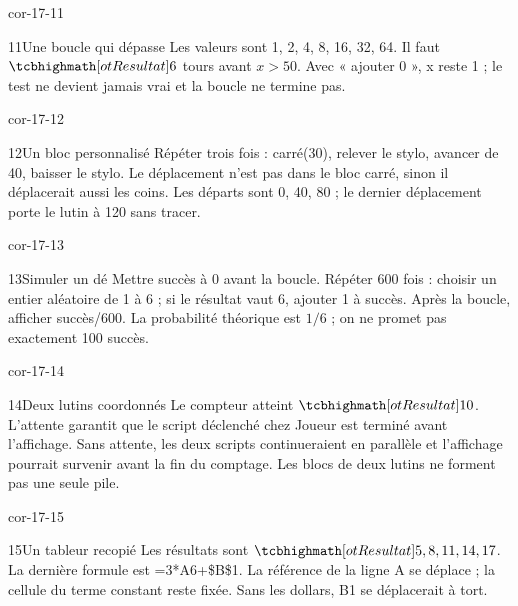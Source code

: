 \begin{blocLivre}{cor-17-11}\begin{corrige}{11}{Une boucle qui dépasse}
Les valeurs sont 1, 2, 4, 8, 16, 32, 64. Il faut $\res6$ tours avant $x>50$. Avec « ajouter 0 », x reste 1 ; le test ne devient jamais vrai et la boucle ne termine pas.
\label{fig-cor-17-11}
\end{corrige}\end{blocLivre}
\begin{blocLivre}{cor-17-12}\begin{corrige}{12}{Un bloc personnalisé}
Répéter trois fois : carré(30), relever le stylo, avancer de 40, baisser le stylo. Le déplacement n’est pas dans le bloc carré, sinon il déplacerait aussi les coins. Les départs sont 0, 40, 80 ; le dernier déplacement porte le lutin à 120 sans tracer.
\label{fig-cor-17-12}
\end{corrige}\end{blocLivre}
\begin{blocLivre}{cor-17-13}\begin{corrige}{13}{Simuler un dé}
Mettre succès à 0 avant la boucle. Répéter 600 fois : choisir un entier aléatoire de 1 à 6 ; si le résultat vaut 6, ajouter 1 à succès. Après la boucle, afficher succès/600. La probabilité théorique est $1/6$ ; on ne promet pas exactement 100 succès.
\label{fig-cor-17-13}
\end{corrige}\end{blocLivre}
\begin{blocLivre}{cor-17-14}\begin{corrige}{14}{Deux lutins coordonnés}
Le compteur atteint $\res{10}$. L’attente garantit que le script déclenché chez Joueur est terminé avant l’affichage. Sans attente, les deux scripts continueraient en parallèle et l’affichage pourrait survenir avant la fin du comptage. Les blocs de deux lutins ne forment pas une seule pile.
\label{fig-cor-17-14}
\end{corrige}\end{blocLivre}
\begin{blocLivre}{cor-17-15}\begin{corrige}{15}{Un tableur recopié}
Les résultats sont $\res{5,8,11,14,17}$. La dernière formule est =3*A6+\$B\$1. La référence de la ligne A se déplace ; la cellule du terme constant reste fixée. Sans les dollars, B1 se déplacerait à tort.
\label{fig-cor-17-15}
\end{corrige}\end{blocLivre}
